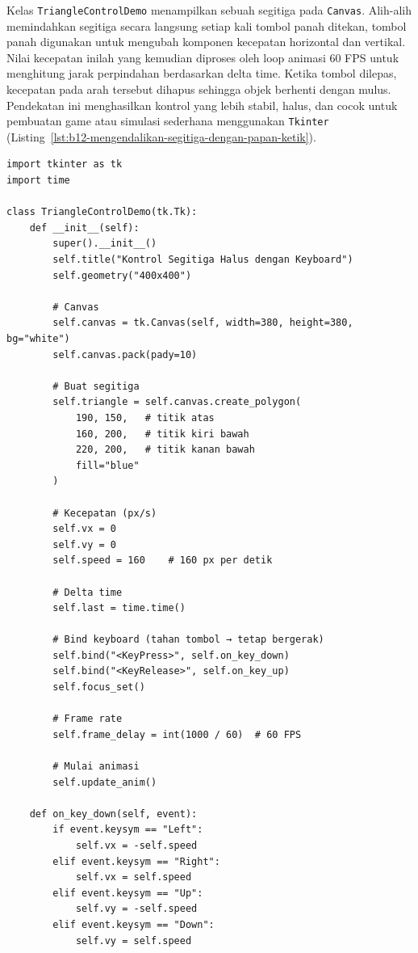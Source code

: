 Kelas \texttt{TriangleControlDemo} menampilkan sebuah segitiga pada \texttt{Canvas}. Alih-alih memindahkan segitiga secara langsung setiap kali tombol panah ditekan, tombol panah digunakan untuk mengubah komponen kecepatan horizontal dan vertikal. Nilai kecepatan inilah yang kemudian diproses oleh loop animasi 60 FPS untuk menghitung jarak perpindahan berdasarkan delta time. Ketika tombol dilepas, kecepatan pada arah tersebut dihapus sehingga objek berhenti dengan mulus. Pendekatan ini menghasilkan kontrol yang lebih stabil, halus, dan cocok untuk pembuatan game atau simulasi sederhana menggunakan \texttt{Tkinter} (Listing~\ref{lst:b12-mengendalikan-segitiga-dengan-papan-ketik}).

\begin{lstlisting}[style=PythonStyle, caption={Mengendalikan segitiga dengan papan ketik}, label={lst:b12-mengendalikan-segitiga-dengan-papan-ketik}]
import tkinter as tk
import time

class TriangleControlDemo(tk.Tk):
    def __init__(self):
        super().__init__()
        self.title("Kontrol Segitiga Halus dengan Keyboard")
        self.geometry("400x400")

        # Canvas
        self.canvas = tk.Canvas(self, width=380, height=380, bg="white")
        self.canvas.pack(pady=10)

        # Buat segitiga
        self.triangle = self.canvas.create_polygon(
            190, 150,   # titik atas
            160, 200,   # titik kiri bawah
            220, 200,   # titik kanan bawah
            fill="blue"
        )

        # Kecepatan (px/s)
        self.vx = 0
        self.vy = 0
        self.speed = 160    # 160 px per detik

        # Delta time
        self.last = time.time()

        # Bind keyboard (tahan tombol → tetap bergerak)
        self.bind("<KeyPress>", self.on_key_down)
        self.bind("<KeyRelease>", self.on_key_up)
        self.focus_set()

        # Frame rate
        self.frame_delay = int(1000 / 60)  # 60 FPS

        # Mulai animasi
        self.update_anim()

    def on_key_down(self, event):
        if event.keysym == "Left":
            self.vx = -self.speed
        elif event.keysym == "Right":
            self.vx = self.speed
        elif event.keysym == "Up":
            self.vy = -self.speed
        elif event.keysym == "Down":
            self.vy = self.speed


\end{lstlisting}
